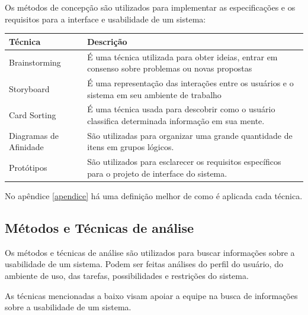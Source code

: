 Os métodos de concepção são utilizados para implementar as especificações e os requisitos para a interface e usabilidade de um sistema:

\begin{tabular}{|p{4cm}|p{8cm}|}
\hline 
Técnica & Descrição \\ 
\hline 
Brainstorming & É uma técnica utilizada para obter ideias, entrar em consenso sobre problemas ou novas propostas \\ 
\hline 
Storyboard & É uma representação das interações entre os usuários e o sistema em seu ambiente de trabalho \\ 
\hline 
Card Sorting & É uma técnica usada para descobrir como o usuário classifica determinada informação em sua mente. \\ 
\hline 
Diagramas de Afinidade & São utilizadas para organizar uma grande quantidade de itens em grupos lógicos. \\ 
\hline 
Protótipos & São utilizados para esclarecer os requisitos específicos para o projeto de interface do sistema. \\ 
\hline 
\end{tabular} 

No apêndice \ref{apendice} há uma definição melhor de como é aplicada cada técnica.

\subsection{Métodos e Técnicas de análise}

Os métodos e técnicas de análise são utilizados para buscar informações sobre a usabilidade de um sistema. Podem ser feitas análises do perfil do usuário, do ambiente de uso, das tarefas, possibilidades e restrições do sistema.

As técnicas mencionadas a baixo visam apoiar a equipe na busca de informações sobre a usabilidade de um sistema. 

